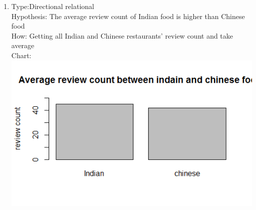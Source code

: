 \documentclass[11pt]{article}
\begin{document}
\begin{enumerate}[(a)]
\begin{enumerate}
\item
Type:Directional relational\\
Hypothesis: The average review count of Indian food is higher than Chinese food\\
How: Getting all Indian and Chinese restaurants' review count and take average\\
Chart:\\
\includegraphics[width=5in]{review_count.png}
\end{enumerate}


\end{enumerate}
\end{document}
